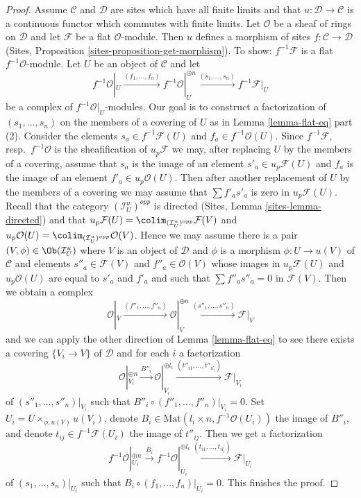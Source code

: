 \begin{proof}
\medskip\noindent
Assume $\mathcal{C}$ and $\mathcal{D}$ are sites which
have all finite limits and that $u : \mathcal{D} \to \mathcal{C}$
is a continuous functor which commutes with finite limits.
Let $\mathcal{O}$ be a sheaf of rings on $\mathcal{D}$
and let $\mathcal{F}$ be a flat $\mathcal{O}$-module.
Then $u$ defines a morphism of sites $f : \mathcal{C} \to \mathcal{D}$
(Sites, Proposition \ref{sites-proposition-get-morphism}).
To show: $f^{-1}\mathcal{F}$ is a flat $f^{-1}\mathcal{O}$-module.
Let $U$ be an object of $\mathcal{C}$ and let
$$
f^{-1}\mathcal{O}|_U \xrightarrow{(f_1, \ldots, f_n)}
f^{-1}\mathcal{O}|_U^{\oplus n} \xrightarrow{(s_1, \ldots, s_n)}
f^{-1}\mathcal{F}|_U
$$
be a complex of $f^{-1}\mathcal{O}|_U$-modules.
Our goal is to construct a factorization of
$(s_1, \ldots, s_n)$ on the members of a covering of $U$
as in Lemma \ref{lemma-flat-eq} part (2).
Consider the elements $s_a \in f^{-1}\mathcal{F}(U)$
and $f_a \in f^{-1}\mathcal{O}(U)$.
Since $f^{-1}\mathcal{F}$, resp.\ $f^{-1}\mathcal{O}$
is the sheafification of $u_p\mathcal{F}$ we may,
after replacing $U$ by the members of a covering,
assume that $s_a$ is the image of an element $s'_a \in u_p\mathcal{F}(U)$ and
$f_a$ is the image of an element $f'_a \in u_p\mathcal{O}(U)$.
Then after another replacement of $U$ by the members of a covering
we may assume that $\sum f'_as'_a$ is zero in $u_p\mathcal{F}(U)$.
Recall that the category $(\mathcal{I}_U^u)^{opp}$ is directed
(Sites, Lemma \ref{sites-lemma-directed})
and that $u_p\mathcal{F}(U) = \colim_{(\mathcal{I}_U^u)^{opp}} \mathcal{F}(V)$
and $u_p\mathcal{O}(U) = \colim_{(\mathcal{I}_U^u)^{opp}} \mathcal{O}(V)$.
Hence we may assume there is a pair $(V, \phi) \in \Ob(\mathcal{I}_U^u)$
where $V$ is an object of $\mathcal{D}$
and $\phi$ is a morphism $\phi : U \to u(V)$ of $\mathcal{C}$
and elements $s''_a \in \mathcal{F}(V)$ and $f''_a \in \mathcal{O}(V)$
whose images in $u_p\mathcal{F}(U)$ and $u_p\mathcal{O}(U)$
are equal to $s'_a$ and $f'_a$ and such that
$\sum f''_a s''_a = 0$ in $\mathcal{F}(V)$.
Then we obtain a complex
$$
\mathcal{O}|_V \xrightarrow{(f''_1, \ldots, f''_n)}
\mathcal{O}|_V^{\oplus n} \xrightarrow{(s''_1, \ldots, s''_n)}
\mathcal{F}|_V
$$
and we can apply the other direction of Lemma \ref{lemma-flat-eq}
to see there exists a covering $\{V_i \to V\}$ of $\mathcal{D}$
and for each $i$ a factorization
$$
\mathcal{O}|_{V_i}^{\oplus n}
\xrightarrow{B''_i}
\mathcal{O}|_{V_i}^{\oplus l_i} \xrightarrow{(t''_{i1}, \ldots, t''_{il_i})}
\mathcal{F}|_{V_i}
$$
of $(s''_1, \ldots, s''_n)|_{V_i}$ such that
$B''_i \circ (f''_1, \ldots, f''_n)|_{V_i} = 0$.
Set $U_i = U \times_{\phi, u(V)} u(V_i)$, denote
$B_i \in \text{Mat}(l_i \times n, f^{-1}\mathcal{O}(U_i))$
the image of $B''_i$, and denote
$t_{ij} \in f^{-1}\mathcal{F}(U_i)$ the image of
$t''_{ij}$. Then we get a factorization
$$
f^{-1}\mathcal{O}|_{U_i}^{\oplus n}
\xrightarrow{B_i}
f^{-1}\mathcal{O}|_{U_i}^{\oplus l_i}
\xrightarrow{(t_{i1}, \ldots, t_{il_i})}
\mathcal{F}|_{U_i}
$$
of $(s_1, \ldots, s_n)|_{U_i}$ such that
$B_i \circ (f_1, \ldots, f_n)|_{U_i} = 0$.
This finishes the proof.
\end{proof}

